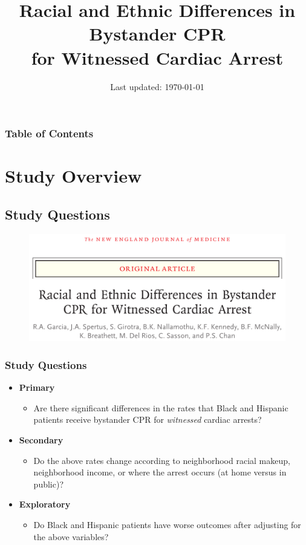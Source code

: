 \documentclass{beamer}
\title{Racial and Ethnic Differences in Bystander CPR \\ for Witnessed Cardiac Arrest}
\author{\me}
\date{Last updated: \today}
\begin{document}
	\begin{frame}
		\maketitle
	\end{frame}
	\begin{frame}
		\frametitle{Table of Contents}
				\tableofcontents
	\end{frame}
\section{Study Overview}
	\subsection{Study Questions}
		\begin{frame}
			\begin{figure}
				\centering
				\includegraphics[width=1.0\linewidth]{img/headline}
				\label{fig:headline}
			\end{figure}
		\end{frame}
		\begin{frame}
			\frametitle{Study Questions}
				\begin{itemize}
					\item \textbf{Primary}
						\begin{itemize}
							\item Are there significant differences in the rates that Black and Hispanic patients receive bystander CPR for \textit{witnessed} cardiac arrests?
						\end{itemize}
					\item \textbf{Secondary}
					\begin{itemize}
						\item Do the above rates change according to neighborhood racial makeup, neighborhood income, or where the arrest occurs (at home versus in public)?
					\end{itemize}
					\item \textbf{Exploratory}
					\begin{itemize}
						\item Do Black and Hispanic patients have worse outcomes after adjusting for the above variables?
					\end{itemize}
				\end{itemize}
		\end{frame}
\end{document}
